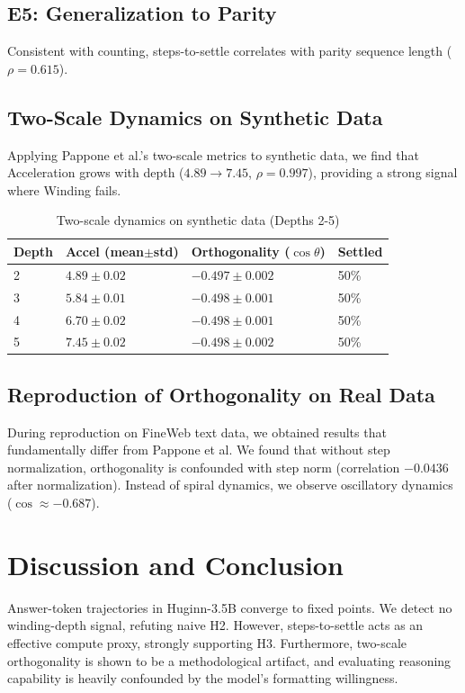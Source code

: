 \documentclass{article}
\begin{document}
\subsection{E5: Generalization to Parity}
Consistent with counting, steps-to-settle correlates with parity sequence length ($\rho = 0.615$). 

\subsection{Two-Scale Dynamics on Synthetic Data}
Applying Pappone et al.'s two-scale metrics to synthetic data, we find that Acceleration grows with depth ($4.89 \rightarrow 7.45$, $\rho = 0.997$), providing a strong signal where Winding fails. 

\begin{table}[H]
\centering
\caption{Two-scale dynamics on synthetic data (Depths 2-5)}
\begin{tabular}{llll}
\toprule
Depth & Accel (mean$\pm$std) & Orthogonality ($\cos\theta$) & Settled \\
\midrule
2 & $4.89 \pm 0.02$ & $-0.497 \pm 0.002$ & 50\% \\
3 & $5.84 \pm 0.01$ & $-0.498 \pm 0.001$ & 50\% \\
4 & $6.70 \pm 0.02$ & $-0.498 \pm 0.001$ & 50\% \\
5 & $7.45 \pm 0.02$ & $-0.498 \pm 0.002$ & 50\% \\
\bottomrule
\end{tabular}
\end{table}

\subsection{Reproduction of Orthogonality on Real Data}
During reproduction on FineWeb text data, we obtained results that fundamentally differ from Pappone et al. We found that without step normalization, orthogonality is confounded with step norm (correlation $-0.0436$ after normalization). Instead of spiral dynamics, we observe oscillatory dynamics ($\cos \approx -0.687$).

\section{Discussion and Conclusion}
Answer-token trajectories in Huginn-3.5B converge to fixed points. We detect no winding-depth signal, refuting naive H2. However, steps-to-settle acts as an effective compute proxy, strongly supporting H3. Furthermore, two-scale orthogonality is shown to be a methodological artifact, and evaluating reasoning capability is heavily confounded by the model's formatting willingness.
\end{document}
